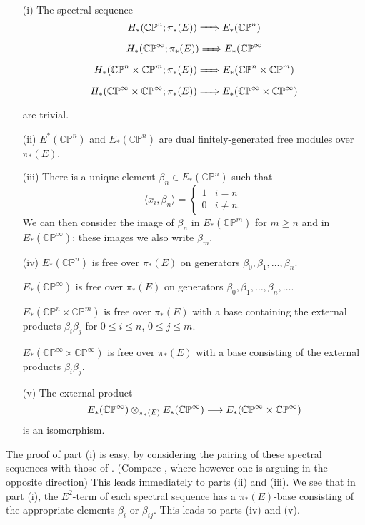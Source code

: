 \documentclass[../main]{subfiles}
\begin{document}
\begin{lemma}
\label{lem:p2c02.14}
\begin{enumerate}
    \item[(i)] The spectral sequence $$H_\ast(\mathbb {CP}^n; \pi_\ast(E)) \xRightarrow{\phantom{.....}} E_\ast(\mathbb {CP}^n)$$ $$H_\ast(\mathbb {CP}^\infty; \pi_\ast(E)) \xRightarrow{\phantom{.....}} E_\ast(\mathbb {CP}^\infty$$ $$H_\ast(\mathbb {CP}^n \times \mathbb {CP}^m; \pi_\ast(E)) \xRightarrow{\phantom{.....}} E_\ast(\mathbb {CP}^n \times \mathbb {CP}^m)$$ $$H_\ast(\mathbb {CP}^\infty \times \mathbb {CP}^\infty; \pi_\ast(E)) \xRightarrow{\phantom{.....}} E_\ast(\mathbb {CP}^\infty \times \mathbb {CP}^\infty)$$ are trivial.
    \item[(ii)] $E^\ast(\mathbb {CP}^n)$ and $E_\ast(\mathbb {CP}^n)$ are dual finitely-generated free modules over $\pi_\ast(E)$.
    \item[(iii)] There is a unique element $\beta_n \in E_\ast(\mathbb {CP}^n)$ such that $$\langle x_i, \beta_n\rangle = \begin{cases}1 & i = n \\ 0 & i \ne n.\end{cases}$$ We can then consider the image of $\beta_n$ in $E_\ast(\mathbb {CP}^m)$ for $m \ge n$ and in $E_\ast(\mathbb {CP}^\infty)$; these images we also write $\beta_m$. 
    \item[(iv)] $E_\ast(\mathbb {CP}^n)$ is free over $\pi_\ast(E)$ on generators $\beta_0, \beta_1, \ldots, \beta_n$.
    
    $E_\ast(\mathbb {CP}^\infty)$ is free over $\pi_\ast(E)$ on generators $\beta_0, \beta_1, \ldots, \beta_n, \ldots$.
    
    $E_\ast(\mathbb {CP}^n \times \mathbb {CP}^m)$ is free over $\pi_\ast(E)$ with a base containing the external products $\beta_i \beta_j$ for $0 \le i \le n$, $0 \le j \le m$. 
    
    $E_\ast(\mathbb {CP}^\infty \times \mathbb {CP}^\infty)$ is free over $\pi_\ast(E)$ with a base consisting of the external products $\beta_i \beta_j$. 
    \item[(v)] The external product $$E_\ast(\mathbb {CP}^\infty) \otimes_{\pi_\ast(E)} E_\ast(\mathbb {CP}^\infty) \overset{}{\longrightarrow} E_\ast(\mathbb {CP}^\infty \times \mathbb {CP}^\infty)$$ is an isomorphism.
\end{enumerate}
\end{lemma}

The proof of part (i) is easy, by considering the pairing of these spectral sequences with those of . (Compare \cite[p.~21]{adams3}, where however one is arguing in the opposite direction) This leads immediately to parts (ii) and (iii). We see that in part (i), the $E^2$-term of each spectral sequence has a $\pi_\ast(E)$-base consisting of the appropriate elements $\beta_i$ or $\beta_{ij}$. This leads to parts (iv) and (v).
\end{document}
